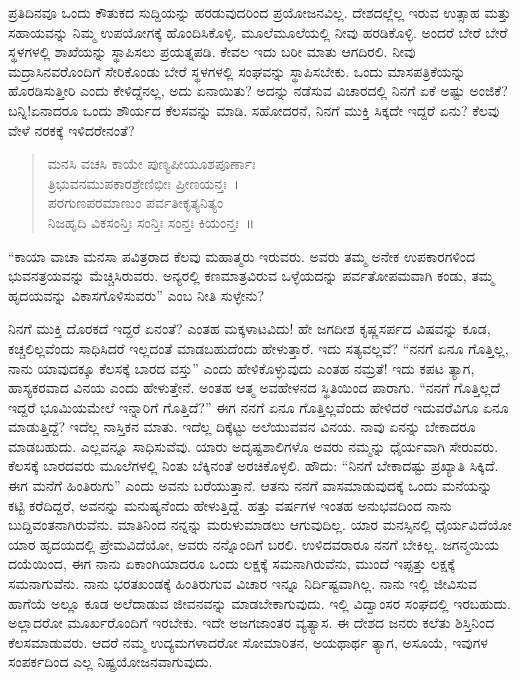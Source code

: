 ಪ್ರತಿದಿನವೂ ಒಂದು ಕೌತುಕದ ಸುದ್ದಿಯನ್ನು ಹರಡುವುದರಿಂದ ಪ್ರಯೋಜನವಿಲ್ಲ. ದೇಶದಲ್ಲೆಲ್ಲ ಇರುವ ಉತ್ಸಾಹ ಮತ್ತು ಸಹಾಯವನ್ನು ನಿಮ್ಮ ಉಪಯೋಗಕ್ಕೆ ಹೊಂದಿಸಿಕೊಳ್ಳಿ. ಮೂಲೆಮೂಲೆಯಲ್ಲಿ ನೀವು ಹರಡಿಕೊಳ್ಳಿ. ಅಂದರೆ ಬೇರೆ ಬೇರೆ ಸ್ಥಳಗಳಲ್ಲಿ ಶಾಖೆಯನ್ನು ಸ್ಥಾಪಿಸಲು ಪ್ರಯತ್ನಪಡಿ. ಕೇವಲ ಇದು ಬರೀ ಮಾತು ಆಗದಿರಲಿ. ನೀವು ಮದ್ರಾಸಿನವರೊಂದಿಗೆ ಸೇರಿಕೊಂಡು ಬೇರೆ ಸ್ಥಳಗಳಲ್ಲಿ ಸಂಘವನ್ನು ಸ್ಥಾಪಿಸಬೇಕು. ಒಂದು ಮಾಸಪತ್ರಿಕೆಯನ್ನು ಹೊರಡಿಸುತ್ತೀರಿ ಎಂದು ಕೇಳಿದ್ದೆನಲ್ಲ, ಅದು ಏನಾಯಿತು? ಅದನ್ನು ನಡೆಸುವ ವಿಚಾರದಲ್ಲಿ ನಿನಗೆ ಏಕೆ ಅಷ್ಟು ಅಂಜಿಕೆ? ಬನ್ನಿ!ಏನಾದರೂ ಒಂದು ಶೌರ್ಯದ ಕೆಲಸವನ್ನು ಮಾಡಿ. ಸಹೋದರನೆ, ನಿನಗೆ ಮುಕ್ತಿ ಸಿಕ್ಕದೇ ಇದ್ದರೆ ಏನು? ಕೆಲವು ವೇಳೆ ನರಕಕ್ಕೆ ಇಳಿದರೇನಂತೆ?
\begin{verse}
 ಮನಸಿ ವಚಸಿ ಕಾಯೇ ಪುಣ್ಯಪೀಯೂಶಪೂರ್ಣಾಃ\\
 ತ್ರಿಭುವನಮುಪಕಾರಶ್ರೇಣಿಭೀಃ ಪ್ರೀಣಯನ್ತಃ~।\\
 ಪರಗುಣಪರಮಾಣುಂ ಪರ್ವತೀಕೃತ್ಯನಿತ್ಯಂ\\
 ನಿಜಹೃದಿ ವಿಕಸಂನ್ತಿಃ ಸಂನ್ತಿಃ ಸಂನ್ತಃ ಕಿಯಂನ್ತಃ~॥ 
\end{verse}


“ಕಾಯಾ ವಾಚಾ ಮನಸಾ ಪವಿತ್ರರಾದ ಕೆಲವು ಮಹಾತ್ಮರು ಇರುವರು. ಅವರು ತಮ್ಮ ಅನೇಕ ಉಪಕಾರಗಳಿಂದ ಭುವನತ್ರಯವನ್ನು ಮೆಚ್ಚಿಸಿರುವರು. ಅನ್ಯರಲ್ಲಿ ಕಣಮಾತ್ರವಿರುವ ಒಳ್ಳೆಯದನ್ನು ಪರ್ವತೋಪಮವಾಗಿ ಕಂಡು, ತಮ್ಮ ಹೃದಯವನ್ನು ವಿಕಾಸಗೊಳಿಸುವರು” ಎಂಬ ನೀತಿ ಸುಳ್ಳೇನು?

ನಿನಗೆ ಮುಕ್ತಿ ದೊರಕದೆ ಇದ್ದರೆ ಏನಂತೆ? ಎಂತಹ ಮಕ್ಕಳಾಟವಿದು! ಹೇ ಜಗದೀಶ ಕೃಷ್ಣಸರ್ಪದ ವಿಷವನ್ನು ಕೂಡ, ಕಚ್ಚಲಿಲ್ಲವೆಂದು ಸಾಧಿಸಿದರೆ ಇಲ್ಲದಂತೆ ಮಾಡಬಹುದೆಂದು ಹೇಳುತ್ತಾರೆ. ಇದು ಸತ್ಯವಲ್ಲವೆ? “ನನಗೆ ಏನೂ ಗೊತ್ತಿಲ್ಲ, ನಾನು ಯಾವುದಕ್ಕೂ ಕೆಲಸಕ್ಕೆ ಬಾರದ ವಸ್ತು” ಎಂದು ಹೇಳಿಕೊಳ್ಳುವುದು ಎಂತಹ ನಮ್ರತೆ! ಇದು ಕಪಟ ತ್ಯಾಗ, ಹಾಸ್ಯಕರವಾದ ವಿನಯ ಎಂದು ಹೇಳುತ್ತೇನೆ. ಅಂತಹ ಆತ್ಮ ಅವಹೇಳನದ ಸ್ಥಿತಿಯಿಂದ ಪಾರಾಗು. “ನನಗೆ ಗೊತ್ತಿಲ್ಲದೆ ಇದ್ದರೆ ಭೂಮಿಯಮೇಲೆ ಇನ್ನಾರಿಗೆ ಗೊತ್ತಿದೆ?” ಈಗ ನನಗೆ ಏನೂ ಗೊತ್ತಿಲ್ಲವೆಂದು ಹೇಳಿದರೆ ಇದುವರೆವಿಗೂ ಏನೂ ಮಾಡುತ್ತಿದ್ದೆ? ಇದೆಲ್ಲ ನಾಸ್ತಿಕನ ಮಾತು. ಇದೆಲ್ಲ ದಿಕ್ಕೆಟ್ಟು ಅಲೆಯುವವನ ವಿನಯ. ನಾವು ಏನನ್ನು ಬೇಕಾದರೂ ಮಾಡಬಹುದು. ಎಲ್ಲವನ್ನೂ ಸಾಧಿಸುವೆವು. ಯಾರು ಅದೃಷ್ಟಶಾಲಿಗಳೊ ಅವರು ನಮ್ಮನ್ನು ಧೈರ್ಯವಾಗಿ ಸೇರುವರು. ಕೆಲಸಕ್ಕೆ ಬಾರದವರು ಮೂಲೆಗಳಲ್ಲಿ ನಿಂತು ಬೆಕ್ಕಿನಂತೆ ಅರಚಿಕೊಳ್ಳಲಿ. ಹೌದು: “ನಿನಗೆ ಬೇಕಾದಷ್ಟು ಪ್ರಖ್ಯಾತಿ ಸಿಕ್ಕಿದೆ. ಈಗ ಮನೆಗೆ ಹಿಂತಿರುಗು” ಎಂದು ಅವನು ಬರೆಯುತ್ತಾನೆ. ಆತನು ನನಗೆ ವಾಸಮಾಡುವುದಕ್ಕೆ ಒಂದು ಮನೆಯನ್ನು ಕಟ್ಟಿ ಕರೆದಿದ್ದರೆ, ಅವನನ್ನು ಮನುಷ್ಯನೆಂದು ಹೇಳುತ್ತಿದ್ದೆ. ಹತ್ತು ವರ್ಷಗಳ ಇಂತಹ ಅನುಭವದಿಂದ ನಾನು ಬುದ್ದಿವಂತನಾಗಿರುವೆನು. ಮಾತಿನಿಂದ ನನ್ನನ್ನು ಮರುಳುಮಾಡಲು ಆಗುವುದಿಲ್ಲ. ಯಾರ ಮನಸ್ಸಿನಲ್ಲಿ ಧೈರ್ಯವಿದೆಯೋ ಯಾರ ಹೃದಯದಲ್ಲಿ ಪ್ರೇಮವಿದೆಯೋ, ಅವರು ನನ್ನೊಂದಿಗೆ ಬರಲಿ. ಉಳಿದವರಾರೂ ನನಗೆ ಬೇಕಿಲ್ಲ. ಜಗನ್ಮಯಿಯ ದಯೆಯಿಂದ, ಈಗ ನಾನು ಏಕಾಂಗಿಯಾದರೂ ಒಂದು ಲಕ್ಷಕ್ಕೆ ಸಮನಾಗಿರುವೆನು, ಮುಂದೆ ಇಪ್ಪತ್ತು ಲಕ್ಷಕ್ಕೆ ಸಮನಾಗುವೆನು. ನಾನು ಭರತಖಂಡಕ್ಕೆ ಹಿಂತಿರುಗುವ ವಿಚಾರ ಇನ್ನೂ ನಿರ್ದಿಷ್ಟವಾಗಿಲ್ಲ. ನಾನು ಇಲ್ಲಿ ಜೀವಿಸುವ ಹಾಗೆಯೆ ಅಲ್ಲೂ ಕೂಡ ಅಲೆದಾಡುವ ಜೀವನವನ್ನು ಮಾಡಬೇಕಾಗುವುದು. ಇಲ್ಲಿ ವಿದ್ವಾಂಸರ ಸಂಘದಲ್ಲಿ ಇರಬಹುದು. ಅಲ್ಲಾದರೋ ಮೂರ್ಖರೊಂದಿಗೆ ಇರಬೇಕು. ಇದೇ ಅಜಗಜಾಂತರ ವ್ಯತ್ಯಾಸ. ಈ ದೇಶದ ಜನರು ಕಲೆತು ಶಿಸ್ತಿನಿಂದ ಕೆಲಸಮಾಡುವರು. ಆದರೆ ನಮ್ಮ ಉದ್ಯಮಗಳಾದರೋ ಸೋಮಾರಿತನ, ಅಯಥಾರ್ಥ ತ್ಯಾಗ, ಅಸೂಯೆ, ಇವುಗಳ ಸಂಪರ್ಕದಿಂದ ಎಲ್ಲ ನಿಷ್ಪ್ರಯೋಜನವಾಗುವುದು.

